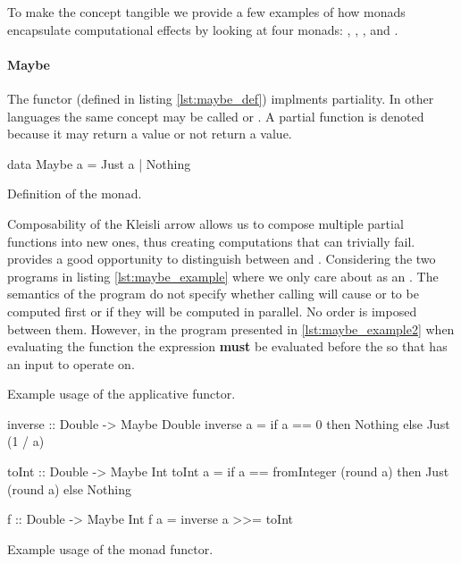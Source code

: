 To make the concept tangible we provide a few examples of how monads
encapsulate computational effects by looking at four monads: ,
 , , and .

\paragraph{Maybe}

The  functor (defined in listing \ref{lst:maybe_def})
implments partiality. In other languages the same concept may be
called  or . A partial function is denoted
 because it may return a value or not return a
value.

\begin{code}
\begin{haskellcode}
data Maybe a = Just a | Nothing
\end{haskellcode}
\label{lst:maybe_def}
\caption{Definition of the  monad.}
\end{code}

Composability of the Kleisli arrow allows us to compose multiple
partial functions into new ones, thus creating computations that can
trivially fail.  provides a good opportunity to
distinguish between  and . Considering
the two programs in listing \ref{lst:maybe_example} where we only care
about  as an . The semantics of the
program do not specify whether calling  will cause
 or  to be computed first or if they
will be computed in parallel. No order is imposed between
them. However, in the program presented in \ref{lst:maybe_example2}
when evaluating the function  the expression 
\textbf{must} be evaluated before the  so that
 has an input to operate on.

\begin{code}
\label{lst:maybe_example}
\caption{Example usage of the  applicative functor.}
\end{code}

\begin{code}
\begin{haskellcode}
inverse :: Double -> Maybe Double
inverse a = if a == 0 then Nothing else Just (1 / a)

toInt :: Double -> Maybe Int
toInt a =
  if a == fromInteger (round a)
    then Just (round a)
    else Nothing

f :: Double -> Maybe Int
f a = inverse a >>= toInt
\end{haskellcode}
\caption{\label{lst:maybe_example2}Example usage of the  monad functor.}
\end{code}

